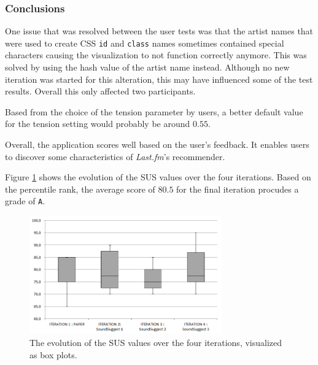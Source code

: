 

\subsubsection{Conclusions}\label{chapter:prototype:section:soundsuggest3:conclusion}

One issue that was resolved between the user tests was that the artist names that were used to create CSS \texttt{id} and \texttt{class} names sometimes contained special characters causing the visualization to not function correctly anymore. This was solved by using the hash value of the artist name instead. Although no new iteration was started for this alteration, this may have influenced some of the test results. Overall this only affected two participants.

Based from the choice of the tension parameter by users, a better default value for the tension setting would probably be around $0.55$.



Overall, the application scores well based on the user's feedback. It enables users to discover some characteristics of \emph{Last.fm}'s recommender.

Figure \ref{fig:iterations_sus_scores_boxplots} shows the evolution of the SUS values over the four iterations. Based on the percentile rank, the average score of $80.5$ for the final iteration procudes a grade of \texttt{A}.

\begin{figure}
	\begin{center}
		\includegraphics[width=8.3cm]{img/iterations_sus_scores_boxplots}
	\end{center}
	\caption{The evolution of the SUS values over the four iterations, visualized as box plots.}
	\label{fig:iterations_sus_scores_boxplots}
\end{figure}



